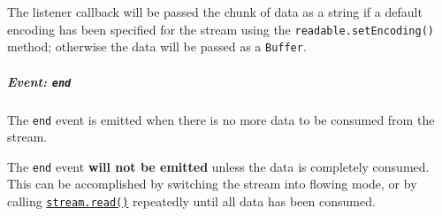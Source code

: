 The listener callback will be passed the chunk of data as a string if a
default encoding has been specified for the stream using the
\texttt{readable.setEncoding()} method; otherwise the data will be
passed as a \texttt{Buffer}.

\begin{Shaded}
\begin{Highlighting}[]
\OperatorTok{=} \NormalTok{()}\OperatorTok{;}
\NormalTok{(}\OperatorTok{,}\KeywordTok{=\textgreater{}}\NormalTok{ \{}
  \NormalTok{(}\SpecialCharTok{$\{}\SpecialCharTok{\}}\NormalTok{)}\OperatorTok{;}
\NormalTok{\})}\OperatorTok{;}
\end{Highlighting}
\end{Shaded}

\subparagraph{\texorpdfstring{Event:
\texttt{\textquotesingle{}end\textquotesingle{}}}{Event: \textquotesingle end\textquotesingle{}}}\label{event-end}

The \texttt{\textquotesingle{}end\textquotesingle{}} event is emitted
when there is no more data to be consumed from the stream.

The \texttt{\textquotesingle{}end\textquotesingle{}} event \textbf{will
not be emitted} unless the data is completely consumed. This can be
accomplished by switching the stream into flowing mode, or by calling
\hyperref[readablereadsize]{\texttt{stream.read()}} repeatedly until all
data has been consumed.

\begin{Shaded}
\begin{Highlighting}[]
\OperatorTok{=} \NormalTok{()}\OperatorTok{;}
\NormalTok{(}\OperatorTok{,}\KeywordTok{=\textgreater{}}\NormalTok{ \{}
  \NormalTok{(}\SpecialCharTok{$\{}\SpecialCharTok{\}}\NormalTok{)}\OperatorTok{;}
\NormalTok{\})}\OperatorTok{;}
\NormalTok{(}\OperatorTok{,}\NormalTok{ () }\KeywordTok{=\textgreater{}}\NormalTok{ \{}
  \NormalTok{(}\NormalTok{)}\OperatorTok{;}
\NormalTok{\})}\OperatorTok{;}
\end{Highlighting}
\end{Shaded}

